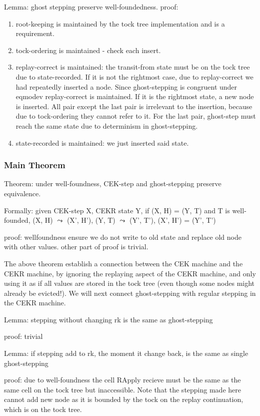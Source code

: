 Lemma: ghost stepping preserve well-foundedness.
proof:
\begin{enumerate}
	\item root-keeping is maintained by the tock tree implementation and is a requirement.
	\item tock-ordering is maintained - check each insert.
	\item replay-correct is maintained: the transit-from state must be on the tock tree due to state-recorded. If it is not the rightmost case, due to replay-correct we had repeatedly inserted a node. Since ghost-stepping is congruent under eqmodev replay-correct is maintained. If it is the rightmost state, a new node is inserted. All pair except the last pair is irrelevant to the insertion, because due to tock-ordering they cannot refer to it. For the last pair, ghost-step must reach the same state due to determinism in ghost-stepping.
	\item state-recorded is maintained: we just inserted said state.
\end{enumerate}

\subsubsection{Main Theorem}
Theorem: under well-foundness, CEK-step and ghost-stepping preserve equivalence.

Formally: given CEK-step X, CEKR state Y, if (X, H) = (Y, T) and T is well-founded, (X, H) $\leadsto$ (X', H'), (Y, T) $\leadsto$ (Y', T'), (X', H') = (Y', T')

proof: wellfoundness ensure we do not write to old state and replace old node with other values. other part of proof is trivial.

The above theorem establish a connection between the CEK machine and the CEKR machine, by ignoring the replaying aspect of the CEKR machine, and only using it as if all values are stored in the tock tree (even though some nodes might already be evicted!). We will next connect ghost-stepping with regular stepping in the CEKR machine.

Lemma: stepping without changing rk is the same as ghost-stepping

proof: trivial

Lemma: if stepping add to rk, the moment it change back, is the same as single ghost-stepping

proof: due to well-foundness the cell RApply recieve must be the same as the same cell on the tock tree but inaccessible. Note that the stepping made here cannot add new node as it is bounded by the tock on the replay continuation, which is on the tock tree.

